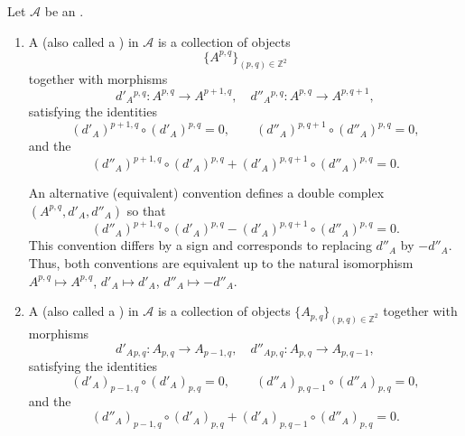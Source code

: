 \begin{definition} \label{definition:double_complex_of_objects_in_an_additive_category}
Let $\mathcal{A}$ be an . 
\begin{enumerate}
    \item A  (also called a ) in $\mathcal{A}$ is a collection of objects
    $$ \{ A^{p,q} \}_{(p,q)\in\mathbb{Z}^2} $$
    together with morphisms
    $$ d'_A{}^{p,q} : A^{p,q} \to A^{p+1,q}, \quad d''_A{}^{p,q} : A^{p,q} \to A^{p,q+1}, $$
    satisfying the identities
    $$ (d'_A)^{p+1,q} \circ (d'_A)^{p,q} = 0, \qquad (d''_A)^{p,q+1} \circ (d''_A)^{p,q} = 0, $$
    and the 
    $$ (d''_A)^{p+1,q} \circ (d'_A)^{p,q} + (d'_A)^{p,q+1} \circ (d''_A)^{p,q} = 0.  $$

    \begin{center}

    \end{center}

    An alternative (equivalent) convention defines a double complex $(A^{p,q},d'_A,d''_A)$ so that
    $$ (d''_A)^{p+1,q} \circ (d'_A)^{p,q} - (d'_A)^{p,q+1} \circ (d''_A)^{p,q} = 0.  $$
    This convention differs by a sign and corresponds to replacing $d''_A$ by $-d''_A$. Thus, both conventions are equivalent up to the natural isomorphism $A^{p,q}\mapsto A^{p,q}$, $d'_A\mapsto d'_A$, $d''_A\mapsto -d''_A$.


    \item A  (also called a ) in $\mathcal{A}$ is a collection of objects $\{ A_{p,q} \}_{(p,q)\in\mathbb{Z}^2}$ together with morphisms
    $$ d'_A{}_{p,q} : A_{p,q} \to A_{p-1,q}, \quad d''_A{}_{p,q} : A_{p,q} \to A_{p,q-1}, $$
    satisfying the identities
    $$ (d'_A)_{p-1,q} \circ (d'_A)_{p,q} = 0, \qquad (d''_A)_{p,q-1} \circ (d''_A)_{p,q} = 0, $$
    and the 
    $$ (d''_A)_{p-1,q} \circ (d'_A)_{p,q} + (d'_A)_{p,q-1} \circ (d''_A)_{p,q} = 0. $$


\end{enumerate}
\end{definition}
